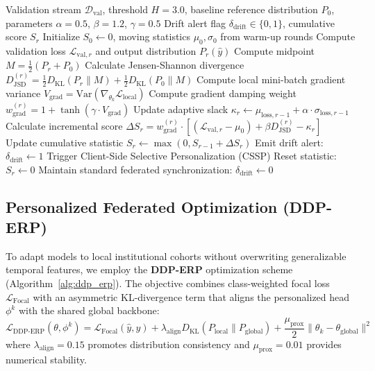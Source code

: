 \documentclass[11pt,a4paper]{article}
\begin{document}
\begin{algorithm}[htbp]
\caption{Adaptive Divergence-Weighted Cumulative Sum (AD-CUSUM)}\label{alg:ad_cusum}
\begin{algorithmic}[1]
\Require Validation stream $\mathcal{D}_{\text{val}}$, threshold $H=3.0$, baseline reference distribution $P_0$, parameters $\alpha=0.5$, $\beta=1.2$, $\gamma=0.5$
\Ensure Drift alert flag $\delta_{\text{drift}} \in \{0, 1\}$, cumulative score $S_r$
\State Initialize $S_0 \leftarrow 0$, moving statistics $\mu_0, \sigma_0$ from warm-up rounds
    \State Compute validation loss $\mathcal{L}_{\text{val}, r}$ and output distribution $P_r(\hat{y})$
    \State Compute midpoint $M = \frac{1}{2}(P_r + P_0)$
    \State Calculate Jensen-Shannon divergence $D_{\text{JSD}}^{(r)} = \frac{1}{2} D_{\text{KL}}(P_r \parallel M) + \frac{1}{2} D_{\text{KL}}(P_0 \parallel M)$
    \State Compute local mini-batch gradient variance $V_{\text{grad}} = \text{Var}(\nabla_{\theta_k} \mathcal{L}_{\text{local}})$
    \State Compute gradient damping weight $w_{\text{grad}}^{(r)} = 1 + \tanh(\gamma \cdot V_{\text{grad}})$
    \State Update adaptive slack $\kappa_r \leftarrow \mu_{\text{loss}, r-1} + \alpha \cdot \sigma_{\text{loss}, r-1}$
    \State Calculate incremental score $\Delta S_r = w_{\text{grad}}^{(r)} \cdot [(\mathcal{L}_{\text{val}, r} - \mu_0) + \beta D_{\text{JSD}}^{(r)} - \kappa_r]$
    \State Update cumulative statistic $S_r \leftarrow \max(0, S_{r-1} + \Delta S_r)$
        \State Emit drift alert: $\delta_{\text{drift}} \leftarrow 1$
        \State Trigger Client-Side Selective Personalization (CSSP)
        \State Reset statistic: $S_r \leftarrow 0$
    \Else
        \State Maintain standard federated synchronization: $\delta_{\text{drift}} \leftarrow 0$
    \EndIf
\EndFor
\end{algorithmic}
\end{algorithm}

\subsection{Personalized Federated Optimization (DDP-ERP)}
To adapt models to local institutional cohorts without overwriting generalizable temporal features, we employ the \textbf{DDP-ERP} optimization scheme (Algorithm~\ref{alg:ddp_erp}). The objective combines class-weighted focal loss $\mathcal{L}_{\text{Focal}}$ with an asymmetric KL-divergence term that aligns the personalized head $\phi^k$ with the shared global backbone:
\begin{equation}
\mathcal{L}_{\text{DDP-ERP}}(\theta, \phi^k) = \mathcal{L}_{\text{Focal}}(\hat{y}, y) + \lambda_{\text{align}} D_{\text{KL}}(P_{\text{local}} \parallel P_{\text{global}}) + \frac{\mu_{\text{prox}}}{2} \|\theta_k - \theta_{\text{global}}\|^2
\end{equation}
where $\lambda_{\text{align}} = 0.15$ promotes distribution consistency and $\mu_{\text{prox}} = 0.01$ provides numerical stability.
\end{document}
